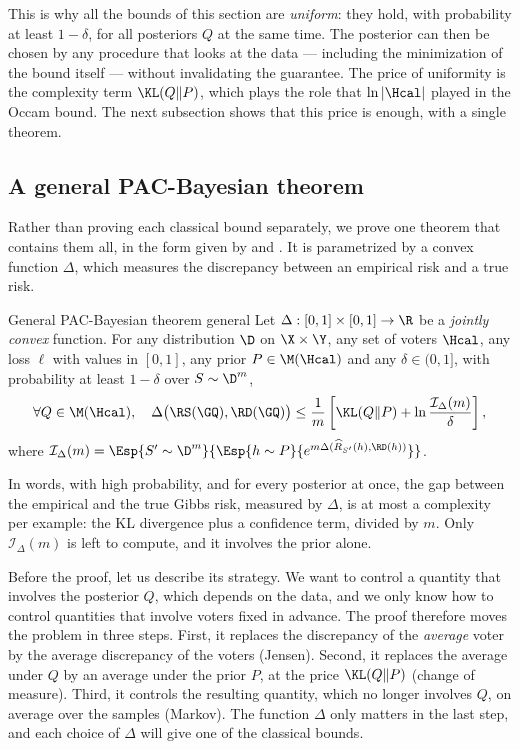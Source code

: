 This is why all the bounds of this section are \emph{uniform}: they hold, with
probability at least $1-\delta$, for all posteriors $Q$ at the same time. The
posterior can then be chosen by any procedure that looks at the data ---
including the minimization of the bound itself --- without invalidating the
guarantee. The price of uniformity is the complexity term $\KL(Q\|P)$, which
plays the role that $\ln|\Hcal|$ played in the Occam bound. The next subsection
shows that this price is enough, with a single theorem.

\subsection{A general PAC-Bayesian theorem}

Rather than proving each classical bound separately, we prove one theorem that
contains them all, in the form given by \citet{germain2009pac} and
\citet{begin2016pac}. It is parametrized by a convex function $\Delta$, which
measures the discrepancy between an empirical risk and a true risk.

\begin{theorem}{General PAC-Bayesian theorem \citep{germain2009pac,begin2016pac}}{general}
Let $\Delta:[0,1]\times[0,1]\to\R$ be a \emph{jointly convex} function. For any
distribution $\D$ on $\X\times\Y$, any set of voters $\Hcal$, any loss
$\ell$ with values in $[0,1]$, any prior $P\in\M(\Hcal)$ and any
$\delta\in(0,1]$, with probability at least $1-\delta$ over $S\sim\D^m$,
\begin{equation}\label{eq:general}
\forall Q\in\M(\Hcal),\quad
\Delta\big(\RS(\GQ),\RD(\GQ)\big)\leq\frac1m\left[\KL(Q\|P)+\ln\frac{\mathcal I_\Delta(m)}{\delta}\right],
\end{equation}
where $\mathcal I_\Delta(m)=\Esp{S'\sim\D^m}{\Esp{h\sim P}{e^{m\Delta(\widehat R_{S'}(h),\RD(h))}}}$.
\end{theorem}

In words, with high probability, and for every posterior at once, the gap
between the empirical and the true Gibbs risk, measured by $\Delta$, is at most
a complexity per example: the KL divergence plus a confidence term, divided by
$m$. Only $\mathcal I_\Delta(m)$ is left to compute, and it involves the prior
alone.

Before the proof, let us describe its strategy. We want to control a
quantity that involves the posterior $Q$, which depends on the data, and we only
know how to control quantities that involve voters fixed in advance. The proof
therefore moves the problem in three steps. First, it replaces the discrepancy of
the \emph{average} voter by the average discrepancy of the voters (Jensen).
Second, it replaces the average under $Q$ by an average under the prior $P$, at
the price $\KL(Q\|P)$ (change of measure). Third, it controls the resulting
quantity, which no longer involves $Q$, on average over the samples (Markov).
The function $\Delta$ only matters in the last step, and each choice of
$\Delta$ will give one of the classical bounds.

